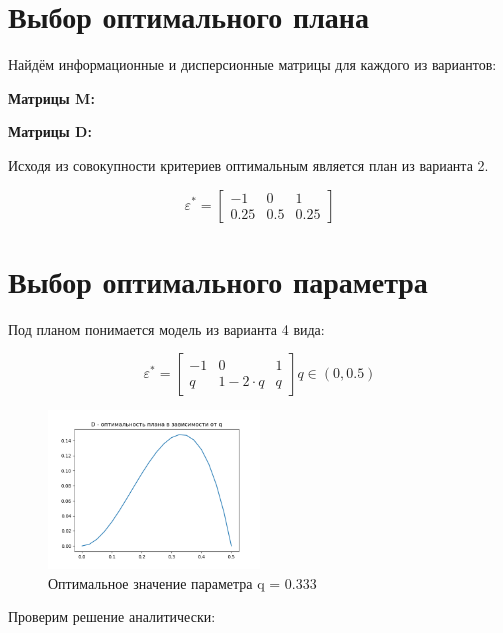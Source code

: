 \section{Выбор оптимального плана}

Найдём информационные и дисперсионные матрицы для каждого из вариантов:

{\bf Матрицы M:}



{\bf Матрицы D:}





Исходя из совокупности критериев оптимальным является план из варианта 2.

\[
	\varepsilon^*= \begin{bmatrix}
	-1		&	0		&	1		\\
	0.25	&	0.5		&	0.25
	\end{bmatrix}
\] 


\section{Выбор оптимального параметра}

Под планом понимается модель из варианта 4 вида:

\[
	\varepsilon^*=
	\begin{bmatrix}
	    -1		& 		 0		 & 		1		\\
 	     q		& 1 - 2\cdot q &		q
	\end{bmatrix}
	q \in (0, 0.5)
\] 


\begin{figure}[!htb] %
	\centering
	\includegraphics[width=0.5\textwidth]{opt_q.png}
	\caption{Оптимальное значение параметра q = 0.333}
\end{figure}


Проверим решение аналитически:

